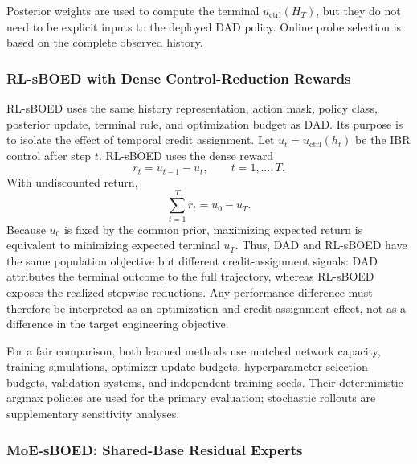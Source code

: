 \documentclass[11pt]{article}
\begin{document}
Posterior weights are used to compute the terminal \(u_{\mathrm{ctrl}}(H_T)\), but they do not need to be explicit inputs to the deployed DAD policy. Online probe selection is based on the complete observed history.

\subsubsection{RL-sBOED with Dense Control-Reduction Rewards}

RL-sBOED uses the same history representation, action mask, policy class,
posterior update, terminal rule, and optimization budget as DAD. Its purpose is
to isolate the effect of temporal credit assignment. Let
\(u_t=u_{\mathrm{ctrl}}(h_t)\) be the IBR control after step \(t\).
RL-sBOED uses the dense reward
\[
\boxed{
r_t=u_{t-1}-u_t,\qquad t=1,\ldots,T.
}
\label{eq:rl_sboed_reward}
\]
With undiscounted return,
\[
\sum_{t=1}^{T}r_t=u_0-u_T.
\]
Because \(u_0\) is fixed by the common prior, maximizing expected return is
equivalent to minimizing expected terminal \(u_T\). Thus, DAD and RL-sBOED
have the same population objective but different credit-assignment signals:
DAD attributes the terminal outcome to the full trajectory, whereas RL-sBOED
exposes the realized stepwise reductions. Any performance difference must
therefore be interpreted as an optimization and credit-assignment effect, not
as a difference in the target engineering objective.

For a fair comparison, both learned methods use matched network capacity,
training simulations, optimizer-update budgets, hyperparameter-selection
budgets, validation systems, and independent training seeds. Their
deterministic argmax policies are used for the primary evaluation; stochastic
rollouts are supplementary sensitivity analyses.

\subsubsection{MoE-sBOED: Shared-Base Residual Experts}
\label{sec:moe_sboed}
\end{document}
